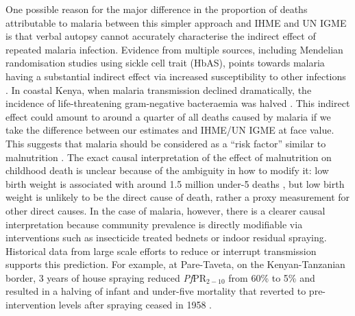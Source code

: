 \documentclass[12pt]{article}
\begin{document}
One possible reason for the major difference in the proportion of deaths attributable to malaria between this simpler approach and IHME and UN IGME is that verbal autopsy cannot accurately characterise the indirect effect of repeated malaria infection. Evidence from multiple sources, including Mendelian randomisation studies using sickle cell trait (HbAS), points towards malaria having a substantial indirect effect via increased susceptibility to other infections \cite{Uyoga:19,Muriuki:21}. In coastal Kenya, when malaria transmission declined dramatically, the incidence of life-threatening gram-negative bacteraemia was halved \cite{scott}. This indirect effect could amount to around a quarter of all deaths caused by malaria if we take the difference between our estimates and IHME/UN IGME at face value. This suggests that malaria should be considered as a ``risk factor'' similar to malnutrition \cite{Madewell2024}. The exact causal interpretation of the effect of malnutrition on childhood death is unclear because of the ambiguity in how to modify it: low birth weight is associated with around 1.5 million under-5 deaths \cite{ritchie:24}, but low birth weight is unlikely to be the direct cause of death, rather a proxy measurement for other direct causes. In the case of malaria, however, there is a clearer causal interpretation because community prevalence is directly modifiable via interventions such as insecticide treated bednets or indoor residual spraying. Historical data from large scale efforts to reduce or interrupt transmission supports this prediction. For example, at Pare-Taveta, on the Kenyan-Tanzanian border, 3 years of house spraying reduced \textit{Pf}PR$_{2-10}$ from 60\% to 5\% and resulted in a halving of infant and under-five mortality that reverted to pre-intervention levels after spraying ceased in 1958 \cite{Smith1959}.

\end{document}
